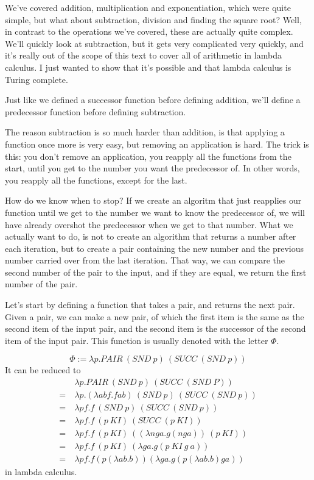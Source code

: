 \documentclass[11pt]{article}
\begin{document}
We've covered addition, multiplication and exponentiation, which were quite
simple, but what about subtraction, division and finding the square root? Well,
in contrast to the operations we've covered, these are actually quite complex.
We'll quickly look at subtraction, but it gets very complicated very quickly,
and it's really out of the scope of this text to cover all of arithmetic in
lambda calculus. I just wanted to show that it's possible and that lambda
calculus is Turing complete.

Just like we defined a successor function before defining addition, we'll
define a predecessor function before defining subtraction.


The reason subtraction is so much harder than addition, is that applying a
function once more is very easy, but removing an application is hard. The trick
is this: you don't remove an application, you reapply all the functions from
the start, until you get to the number you want the predecessor of. In other
words, you reapply all the functions, except for the last.

How do we know when to stop? If we create an algoritm that just reapplies our
function until we get to the number we want to know the predecessor of, we will
have already overshot the predecessor when we get to that number. What we
actually want to do, is not to create an algorithm that returns a number after
each iteration, but to create a pair containing the new number and the previous
number carried over from the last iteration. That way, we can compare the
second number of the pair to the input, and if they are equal, we return the
first number of the pair.

Let's start by defining a function that takes a pair, and returns the next
pair. Given a pair, we can make a new pair, of which the first item is the same
as the second item of the input pair, and the second item is the successor of
the second item of the input pair. This function is usually denoted with the
letter \(\Phi\).

\[\Phi:=\lambda p.PAIR\ (SND\ p)\ (SUCC\ (SND\ p))\]
It can be reduced to
\begin{align*}
	&\lambda p.PAIR\ (SND\ p)\ (SUCC\ (SND\ P))\\
	=\ &\lambda p.(\lambda abf.fab)\ (SND\ p)\ (SUCC\ (SND\ p))\\
	=\ &\lambda pf.f\ (SND\ p)\ (SUCC\ (SND\ p))\\
	=\ &\lambda pf.f\ (p\ KI)\ (SUCC\ (p\ KI))\\
	=\ &\lambda pf.f\ (p\ KI)\ ((\lambda nga.g(nga))\ (p\ KI))\\
	=\ &\lambda pf.f\ (p\ KI)\ (\lambda ga.g(p\ KI\ g\ a))\\
	=\ &\lambda pf.f(p(\lambda ab.b))(\lambda ga.g(p(\lambda ab.b)ga))
\end{align*}
in lambda calculus.
\end{document}
